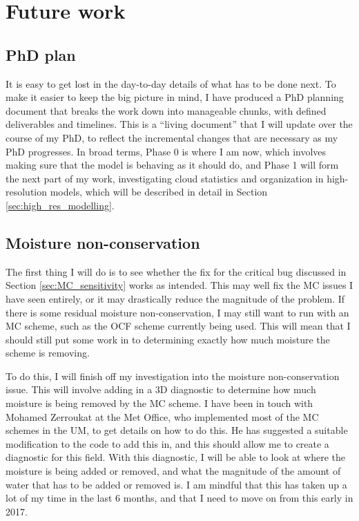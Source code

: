 \documentclass[11pt,a4paper]{article}
\begin{document}
\section{Future work}

\subsection{PhD plan}
It is easy to get lost in the day-to-day details of what has to be done next. To make it easier to keep the big picture in mind, I have produced a PhD planning document that breaks the work down into manageable chunks, with defined deliverables and timelines. This is a ``living document'' that I will update over the course of my PhD, to reflect the incremental changes that are necessary as my PhD progresses. In broad terms, Phase 0 is where I am now, which involves making sure that the model is behaving as it should do, and Phase 1 will form the next part of my work, investigating cloud statistics and organization in high-resolution models, which will be described in detail in Section \ref{sec:high_res_modelling}.

\subsection{Moisture non-conservation}

The first thing I will do is to see whether the fix for the critical bug discussed in Section \ref{sec:MC_sensitivity} works as intended. This may well fix the MC issues I have seen entirely, or it may drastically reduce the magnitude of the problem. If there is some residual moisture non-conservation, I may still want to run with an MC scheme, such as the OCF scheme currently being used. This will mean that I should still put some work in to determining exactly how much moisture the scheme is removing.

To do this, I will finish off my investigation into the moisture non-conservation issue. This will involve adding in a 3D diagnostic to determine how much moisture is being removed by the MC scheme. I have been in touch with Mohamed Zerroukat at the Met Office, who implemented most of the MC schemes in the UM, to get details on how to do this. He has suggested a suitable modification to the code to add this in, and this should allow me to create a diagnostic for this field. With this diagnostic, I will be able to look at where the moisture is being added or removed, and what the magnitude of the amount of water that has to be added or removed is. I am mindful that this has taken up a lot of my time in the last 6 months, and that I need to move on from this early in 2017.
\end{document}

